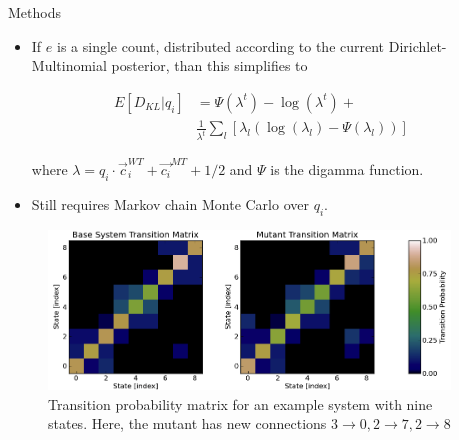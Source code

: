\documentclass[final]{beamer}
\begin{document}
\begin{frame}{}
\begin{columns}[t]
\begin{column}{.3\linewidth}
\begin{block}{Methods}
\begin{itemize}
\item If $e$ is a single count, distributed according to the current Dirichlet-Multinomial posterior, than this simplifies to

\begin{align*}
E[D_{KL} \vert q_i] &= \Psi(\lambda^t) - \log(\lambda^t) + \\
 &\frac{1}{\lambda^t} \sum_l \left[ \lambda_l \left( \log (\lambda_l) - \Psi(\lambda_l) \right) \right] 
\end{align*}

where $\lambda = q_i \cdot \vec{c}_i^{WT} + \vec{c_i}^{MT} + 1/2$ and $\Psi$ is the digamma function.

\item Still requires Markov chain Monte Carlo over $q_i$.

\end{itemize}
\end{block}
\vspace{1in}


\begin{figure}
    \centering
 \includegraphics[width=\textwidth]{../code/9x9graph/plots/transition_matrices-tight.png}
    \caption{Transition probability matrix for an example system with nine states. Here, the mutant has new connections $3\rightarrow 0, 2\rightarrow 7, 2\rightarrow 8$}
\end{figure}


% 



\end{column}
\begin{column}{.3\linewidth}


\end{column}
\end{columns}
\end{frame}
\end{document}
